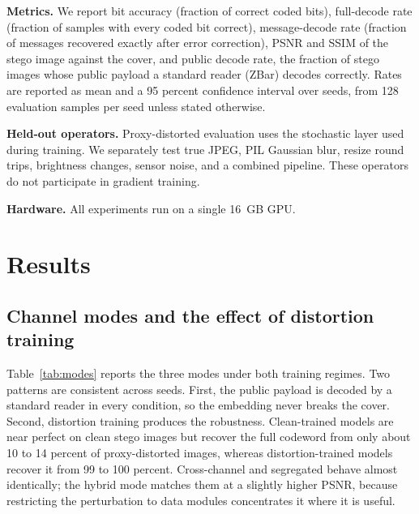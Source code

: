 \documentclass[conference]{IEEEtran}
\begin{document}
\textbf{Metrics.} We report bit accuracy (fraction of correct coded bits), full-decode
rate (fraction of samples with every coded bit correct), message-decode rate (fraction
of messages recovered exactly after error correction), PSNR and SSIM of the stego image
against the cover, and public decode rate, the fraction of stego images whose public
payload a standard reader (ZBar) decodes correctly. Rates are reported as mean and a 95
percent confidence interval over seeds, from 128 evaluation samples per seed unless stated
otherwise.

\textbf{Held-out operators.} Proxy-distorted evaluation uses the stochastic layer used
during training. We separately test true JPEG, PIL Gaussian blur, resize round trips,
brightness changes, sensor noise, and a combined pipeline. These operators do not
participate in gradient training.

\textbf{Hardware.} All experiments run on a single 16~GB GPU.

\section{Results}

\subsection{Channel modes and the effect of distortion training}
Table~\ref{tab:modes} reports the three modes under both training regimes. Two patterns
are consistent across seeds. First, the public payload is decoded by a standard reader in
every condition, so the embedding never breaks the cover. Second, distortion training
produces the robustness. Clean-trained models are near perfect on clean stego images but
recover the full codeword from only about 10 to 14 percent of proxy-distorted images,
whereas distortion-trained models recover it from 99 to 100 percent. Cross-channel and segregated
behave almost identically; the hybrid mode matches them at a slightly higher PSNR, because
restricting the perturbation to data modules concentrates it where it is useful.
\end{document}

